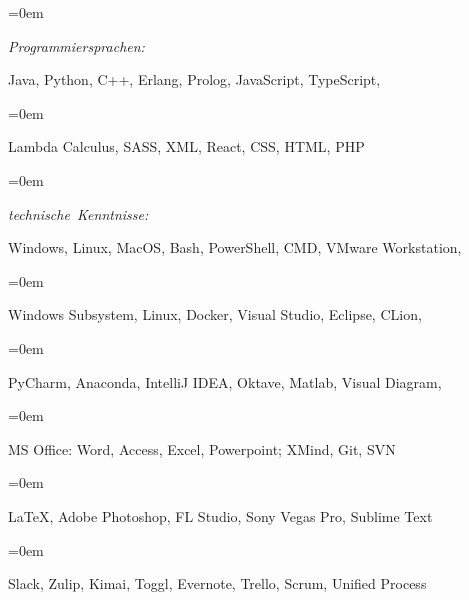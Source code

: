 \documentclass[paper=a4,fontsize=10.4pt]{scrartcl} %
\newlength{\spacebox}
\newcommand{\sepspace}{\vspace*{0.5em}}		%
\newcommand{\PersonalEntry}[2]{
		\noindent\hangindent=0em\hangafter=0 %
		\parbox{\spacebox}{        %
		\mbox {\textit{#1}}}		       %
		\hspace{5em} #2 \par}    %
\newcommand{\SkillsEntry}[2]{      %
		\noindent\hangindent=0em\hangafter=0 %
		\parbox{\spacebox}{        %
		\mbox{\textit{#1}}}			   %
		\hspace{6em} #2 \par}    %
\begin{document}
\sepspace

\SkillsEntry{Programmiersprachen:}{Java, Python, C++, Erlang, Prolog, JavaScript, TypeScript,}
\SkillsEntry{}{Lambda Calculus, SASS, XML, React, CSS, HTML, PHP}

\sepspace

\SkillsEntry{technische Kenntnisse:}{Windows, Linux, MacOS, Bash, PowerShell, CMD, VMware Workstation, } 
\SkillsEntry{}{Windows Subsystem, Linux, Docker, Visual Studio, Eclipse, CLion,}
\SkillsEntry{}{PyCharm, Anaconda, IntelliJ IDEA, Oktave, Matlab, Visual Diagram,}
\SkillsEntry{}{MS Office: Word, Access, Excel, Powerpoint; XMind, Git, SVN}
\SkillsEntry{}{\LaTeX, Adobe Photoshop, FL Studio, Sony Vegas Pro, Sublime Text}
\SkillsEntry{}{Slack, Zulip, Kimai, Toggl, Evernote, Trello, Scrum, Unified Process}
\end{document}

